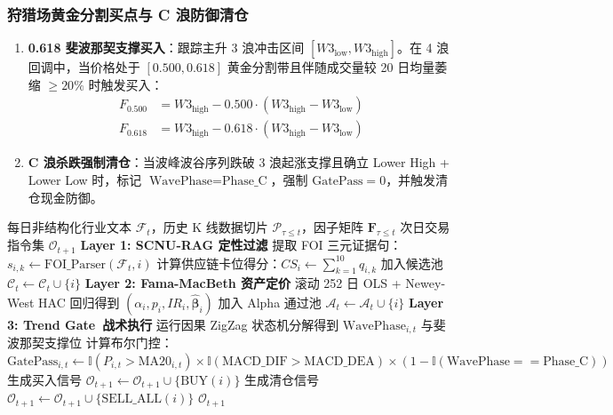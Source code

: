 \documentclass[11pt,a4paper]{article}
\begin{document}
\subsubsection{狩猎场黄金分割买点与 C 浪防御清仓}
\begin{enumerate}
    \item \textbf{0.618 斐波那契支撑买入}：跟踪主升 3 浪冲击区间 $[W3_{\text{low}}, W3_{\text{high}}]$。在 4 浪回调中，当价格处于 $[0.500, 0.618]$ 黄金分割带且伴随成交量较 20 日均量萎缩 $\ge 20\%$ 时触发买入：
    \begin{align}
    F_{0.500} &= W3_{\text{high}} - 0.500 \cdot (W3_{\text{high}} - W3_{\text{low}}) \\
    F_{0.618} &= W3_{\text{high}} - 0.618 \cdot (W3_{\text{high}} - W3_{\text{low}})
    \end{align}
    \item \textbf{C 浪杀跌强制清仓}：当波峰波谷序列跌破 3 浪起涨支撑且确立 Lower High + Lower Low 时，标记 $\text{WavePhase} = \text{Phase\_C}$，强制 $\text{GatePass} = 0$，并触发清仓现金防御。
\end{enumerate}

\begin{algorithm}[htbp]
\caption{解耦三引擎量化交易主循环 (Decoupled Triple-Engine Pipeline)}
\label{alg:pipeline}
\begin{algorithmic}[1]
\REQUIRE 每日非结构化行业文本 $\mathcal{F}_t$，历史 K 线数据切片 $\mathcal{P}_{\tau \le t}$，因子矩阵 $\mathbf{F}_{\tau \le t}$
\ENSURE 次日交易指令集 $\mathcal{O}_{t+1}$
\STATE \textbf{Layer 1: SCNU-RAG 定性过滤}
    \STATE 提取 FOI 三元证据句：$s_{i,k} \gets \text{FOI\_Parser}(\mathcal{F}_t, i)$
    \STATE 计算供应链卡位得分：$CS_i \gets \sum_{k=1}^{10} q_{i,k}$
        \STATE 加入候选池 $\mathcal{C}_t \gets \mathcal{C}_t \cup \{i\}$
    \ENDIF
\ENDFOR
\STATE \textbf{Layer 2: Fama-MacBeth 资产定价}
    \STATE 滚动 252 日 OLS + Newey-West HAC 回归得到 $(\alpha_i, p_i, IR_i, \hat{\boldsymbol{\beta}}_i)$
        \STATE 加入 Alpha 通过池 $\mathcal{A}_t \gets \mathcal{A}_t \cup \{i\}$
    \ENDIF
\ENDFOR
\STATE \textbf{Layer 3: Trend Gate\texttrademark\ 战术执行}
    \STATE 运行因果 ZigZag 状态机分解得到 $\text{WavePhase}_{i,t}$ 与斐波那契支撑位
    \STATE 计算布尔门控：$\text{GatePass}_{i,t} \gets \mathbb{I}(P_{i,t} > \text{MA20}_{i,t}) \times \mathbb{I}(\text{MACD\_DIF} > \text{MACD\_DEA}) \times (1 - \mathbb{I}(\text{WavePhase} == \text{Phase\_C}))$
        \STATE 生成买入信号 $\mathcal{O}_{t+1} \gets \mathcal{O}_{t+1} \cup \{\text{BUY}(i)\}$
        \STATE 生成清仓信号 $\mathcal{O}_{t+1} \gets \mathcal{O}_{t+1} \cup \{\text{SELL\_ALL}(i)\}$
    \ENDIF
\ENDFOR
\RETURN $\mathcal{O}_{t+1}$
\end{algorithmic}
\end{algorithm}
\end{document}

